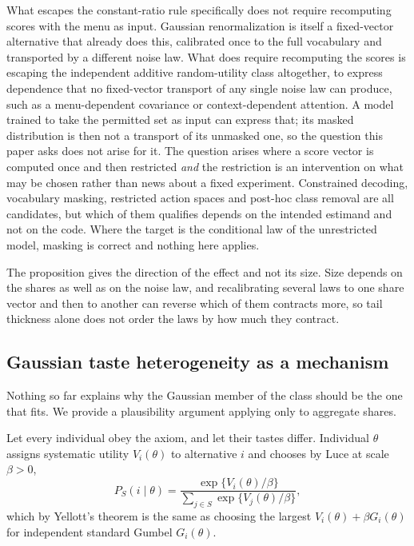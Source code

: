 \documentclass[11pt]{article}
\begin{document}
What escapes the constant-ratio rule specifically does not require recomputing scores with the
menu as input. Gaussian renormalization is itself a fixed-vector alternative that already does
this, calibrated once to the full vocabulary and transported by a different noise law. What does
require recomputing the scores is escaping the independent additive random-utility class
altogether, to express dependence that no fixed-vector transport of any single noise law can
produce, such as a menu-dependent covariance or context-dependent attention. A model trained to
take the permitted set as input can express that; its masked distribution is then not a transport
of its unmasked one, so the question this paper asks does not arise for it. The question arises
where a score vector is computed once and then restricted \emph{and} the restriction is an
intervention on what may be chosen rather than news about a fixed experiment. Constrained
decoding, vocabulary masking, restricted action spaces and post-hoc class removal are all
candidates, but which of them qualifies depends on the intended estimand and not on the code.
Where the target is the conditional law of the unrestricted model, masking is correct and nothing
here applies.

The proposition gives the direction of the effect and not its size. Size depends on the shares
as well as on the noise law, and recalibrating several laws to one share vector and then to
another can reverse which of them contracts more, so tail thickness alone does not order the
laws by how much they contract.

\subsection{Gaussian taste heterogeneity as a mechanism}
\label{sec:mixture}

Nothing so far explains why the Gaussian member of the class should be the one that fits.
We provide a plausibility argument applying only to aggregate shares.

Let every individual obey the axiom, and let their tastes differ. Individual $\theta$
assigns systematic utility $V_i(\theta)$ to alternative $i$ and chooses by Luce at scale
$\beta > 0$,
\begin{equation}
P_S(i \mid \theta) = \frac{\exp\{V_i(\theta)/\beta\}}{\sum_{j \in S}\exp\{V_j(\theta)/\beta\}},
\label{eq:condluce}
\end{equation}
which by Yellott's theorem is the same as choosing the largest
$V_i(\theta) + \beta G_i(\theta)$ for independent standard Gumbel $G_i(\theta)$.
\end{document}
